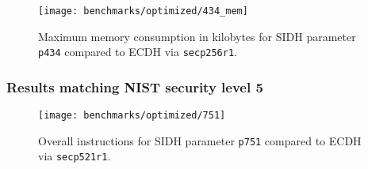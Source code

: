 \begin{figure}[H]
  \centering
  \texttt{[image: benchmarks/optimized/434\_mem]}
  \caption[Maximum memory consumption p434]
  {Maximum memory consumption in kilobytes for SIDH parameter \texttt{p434} compared to ECDH via \texttt{secp256r1}.}
  \label{fig:results_opt_434_mem}
\end{figure}

%
%
%

\subsubsection{Results matching NIST security level 5}
\begin{figure}[H]
  \centering
  \texttt{[image: benchmarks/optimized/751]}
  \caption[Overall instructions p751]
  {Overall instructions for SIDH parameter \texttt{p751} compared to ECDH via \texttt{secp521r1}.}
  \label{fig:results_opt_751}
\end{figure}

